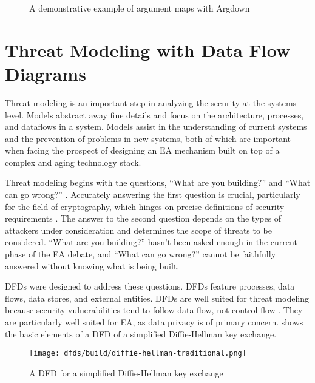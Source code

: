 \begin{figure}[h]
    \centering\CaptionFontSize
    \caption{A demonstrative example of argument maps with Argdown}
    \label{fig-args-key}
\end{figure}


\section{Threat Modeling with Data Flow Diagrams}
\label{sec-threat-model-intro}

Threat modeling is an important step in analyzing the security at the systems level. Models abstract away fine details
and focus on the architecture, processes, and dataflows in a system. Models assist in the understanding of current
systems and the prevention of problems in new systems, both of which are important when facing the prospect of designing
an \ac{EA} mechanism built on top of a complex and aging technology stack.

Threat modeling begins with the questions, ``What are you building?'' and ``What can go wrong?''
\cite{shostack_threat_2014}. Accurately answering the first question is crucial, particularly for the field of
cryptography, which hinges on precise definitions of security requirements \cite{varia_2018}. The answer to the second
question depends on the types of attackers under consideration and determines the scope of threats to be considered.
``What are you building?'' hasn't been asked enough in the current phase of the \ac{EA} debate, and ``What can go
wrong?'' cannot be faithfully answered without knowing what is being built.

\Acp{DFD} were designed to address these questions. \Acp{DFD} feature processes, data flows, data stores, and external
entities. \Acp{DFD} are well suited for threat modeling because security vulnerabilities tend to follow data flow, not
control flow \cite{shostack_threat_2014}. They are particularly well suited for \ac{EA}, as data privacy is of primary
concern.  shows the basic elements of a \ac{DFD} of a simplified Diffie-Hellman key
exchange.

\begin{figure}[h]
    \centering\CaptionFontSize
    \texttt{[image: dfds/build/diffie-hellman-traditional.png]}
    \caption{A \acf{DFD} for a simplified Diffie-Hellman key exchange}
    \label{fig-dfd-dh-traditional}
\end{figure}

